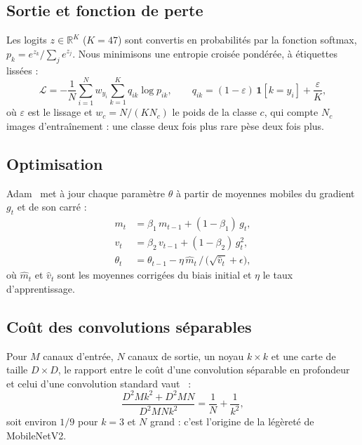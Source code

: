 \documentclass[conference]{IEEEtran}
\newcommand{\todo}{\textcolor{red}{\textbf{??}}}
\newcommand{\nClasses}{47}\newcommand{\imbalance}{\todo}\newcommand{\nDup}{\todo}
\begin{document}
\subsection{Sortie et fonction de perte}
Les logits $z \in \mathbb{R}^K$ ($K = \nClasses$) sont convertis en probabilités par la fonction softmax, $p_k = e^{z_k} / \sum_{j} e^{z_j}$. Nous minimisons une entropie croisée pondérée, à étiquettes lissées :
\begin{equation}
\mathcal{L} = -\frac{1}{N}\sum_{i=1}^{N} w_{y_i} \sum_{k=1}^{K} q_{ik} \log p_{ik},\qquad q_{ik} = (1-\varepsilon)\,\mathbf{1}[k = y_i] + \frac{\varepsilon}{K},
\end{equation}
où $\varepsilon$ est le lissage et $w_c = N / (K N_c)$ le poids de la classe $c$, qui compte $N_c$ images d'entraînement : une classe deux fois plus rare pèse deux fois plus.

\subsection{Optimisation}
Adam~\cite{kingma2015} met à jour chaque paramètre $\theta$ à partir de moyennes mobiles du gradient $g_t$ et de son carré :
\begin{equation}
\begin{aligned}
m_t &= \beta_1\, m_{t-1} + (1-\beta_1)\, g_t,\\
v_t &= \beta_2\, v_{t-1} + (1-\beta_2)\, g_t^2,\\
\theta_t &= \theta_{t-1} - \eta\, \hat m_t \,/\, \bigl(\sqrt{\hat v_t}+\epsilon\bigr),
\end{aligned}
\end{equation}
où $\hat m_t$ et $\hat v_t$ sont les moyennes corrigées du biais initial et $\eta$ le taux d'apprentissage.

\subsection{Coût des convolutions séparables}
Pour $M$ canaux d'entrée, $N$ canaux de sortie, un noyau $k{\times}k$ et une carte de taille $D{\times}D$, le rapport entre le coût d'une convolution séparable en profondeur et celui d'une convolution standard vaut~\cite{howard2017} :
\begin{equation}
\frac{D^2 M k^2 + D^2 M N}{D^2 M N k^2} = \frac{1}{N} + \frac{1}{k^2},
\end{equation}
soit environ $1/9$ pour $k = 3$ et $N$ grand : c'est l'origine de la légèreté de MobileNetV2.
\end{document}
